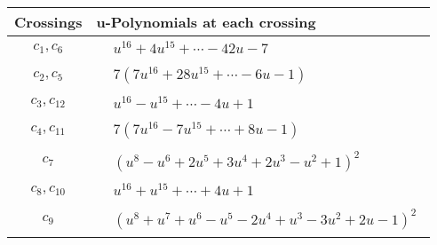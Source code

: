 \documentclass[1p]{elsarticle_modified}
\theoremstyle{definition}
\begin{document}
\begin{tabular}{m{50pt}|m{274pt}}
Crossings & \hspace{64pt}u-Polynomials at each crossing \\
\hline $$\begin{aligned}c_{1},c_{6}\end{aligned}$$&$\begin{aligned}
&u^{16}+4 u^{15}+\cdots-42 u-7
\end{aligned}$\\
\hline $$\begin{aligned}c_{2},c_{5}\end{aligned}$$&$\begin{aligned}
&7(7 u^{16}+28 u^{15}+\cdots-6 u-1)
\end{aligned}$\\
\hline $$\begin{aligned}c_{3},c_{12}\end{aligned}$$&$\begin{aligned}
&u^{16}- u^{15}+\cdots-4 u+1
\end{aligned}$\\
\hline $$\begin{aligned}c_{4},c_{11}\end{aligned}$$&$\begin{aligned}
&7(7 u^{16}-7 u^{15}+\cdots+8 u-1)
\end{aligned}$\\
\hline $$\begin{aligned}c_{7}\end{aligned}$$&$\begin{aligned}
&(u^8- u^6+2 u^5+3 u^4+2 u^3- u^2+1)^2
\end{aligned}$\\
\hline $$\begin{aligned}c_{8},c_{10}\end{aligned}$$&$\begin{aligned}
&u^{16}+u^{15}+\cdots+4 u+1
\end{aligned}$\\
\hline $$\begin{aligned}c_{9}\end{aligned}$$&$\begin{aligned}
&(u^8+u^7+u^6- u^5-2 u^4+u^3-3 u^2+2 u-1)^2
\end{aligned}$\\
\hline
\end{tabular}\\~\\
\newpage\renewcommand{\arraystretch}{1}
\end{document}
